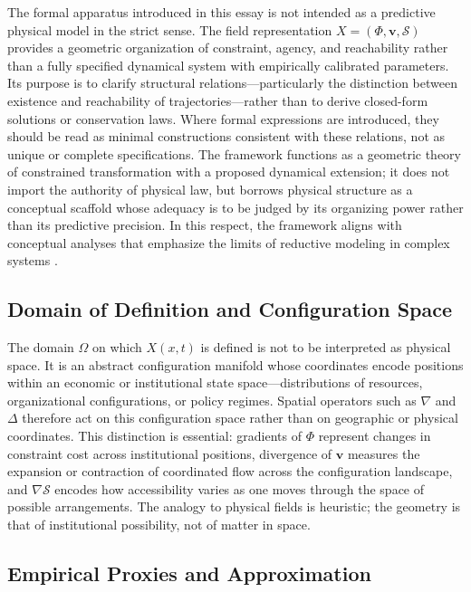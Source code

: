 \documentclass[11pt, a4paper]{article}
\begin{document}
The formal apparatus introduced in this essay is not intended as a predictive physical model in the strict sense. The field representation $X = (\Phi, \mathbf{v}, \mathcal{S})$ provides a geometric organization of constraint, agency, and reachability rather than a fully specified dynamical system with empirically calibrated parameters. Its purpose is to clarify structural relations---particularly the distinction between existence and reachability of trajectories---rather than to derive closed-form solutions or conservation laws. Where formal expressions are introduced, they should be read as minimal constructions consistent with these relations, not as unique or complete specifications. The framework functions as a geometric theory of constrained transformation with a proposed dynamical extension; it does not import the authority of physical law, but borrows physical structure as a conceptual scaffold whose adequacy is to be judged by its organizing power rather than its predictive precision. In this respect, the framework aligns with conceptual analyses that emphasize the limits of reductive modeling in complex systems \cite{wilson2006,gleiser2025}.

\subsection{Domain of Definition and Configuration Space}

The domain $\Omega$ on which $X(x,t)$ is defined is not to be interpreted as physical space. It is an abstract configuration manifold whose coordinates encode positions within an economic or institutional state space---distributions of resources, organizational configurations, or policy regimes. Spatial operators such as $\nabla$ and $\Delta$ therefore act on this configuration space rather than on geographic or physical coordinates. This distinction is essential: gradients of $\Phi$ represent changes in constraint cost across institutional positions, divergence of $\mathbf{v}$ measures the expansion or contraction of coordinated flow across the configuration landscape, and $\nabla\mathcal{S}$ encodes how accessibility varies as one moves through the space of possible arrangements. The analogy to physical fields is heuristic; the geometry is that of institutional possibility, not of matter in space.

\subsection{Empirical Proxies and Approximation}
\end{document}
